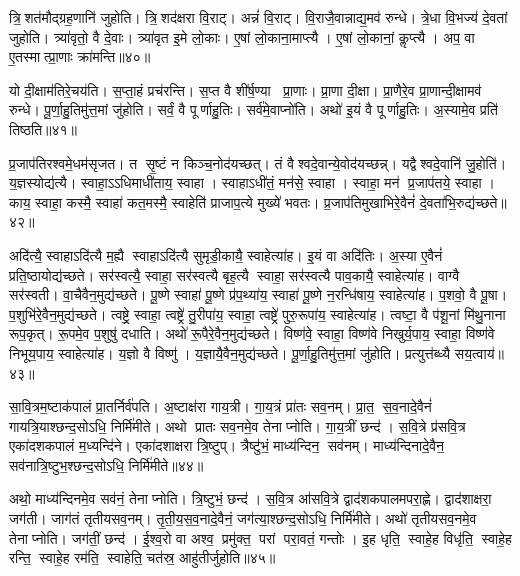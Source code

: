त्रि॒शत॑मौद्ग्रह॒णानि॑ जुहोति। त्रि॒शद॑क्षरा वि॒राट्। अन्नं॑ वि॒राट्। वि॒राजै॒वान्नाद्य॒मव॑ रुन्धे। त्रे॒धा वि॒भज्य॑ दे॒वतां जुहोति। त्र्या॑वृतो॒ वै दे॒वाः। त्र्या॑वृत इ॒मे लो॒काः। ए॒षां लो॒काना॒माप्त्यै। ए॒षां लो॒कानां॒ कॢप्त्यै। अप॒ वा ए॒तस्मात्प्रा॒णाः क्रा॑मन्ति॥४०॥

यो दी॒क्षाम॑तिरे॒चय॑ति। स॒प्ता॒हं प्रच॑रन्ति। स॒प्त वै शी॑र्\mbox{}ष॒ण्या प्रा॒णाः। प्रा॒णा दी॒क्षा। प्रा॒णैरे॒व प्रा॒णान्दी॒क्षामव॑ रुन्धे। पू॒र्णा॒हु॒तिमु॑त्त॒मां जु॑होति। सर्वं॒ वै पूर्णाहु॒तिः। सर्व॑मे॒वाप्नो॑ति। अथो॑ इ॒यं वै पूर्णाहु॒तिः। अ॒स्यामे॒व प्रति॑ तिष्ठति॥४१॥\anuvakamend[रु॒न्धे॒ प्रा॒णान्दी॒क्षामव॑ रुन्ध उच्यते क्रामन्ति तिष्ठति]

प्र॒जाप॑तिरश्वमे॒धम॑सृजत। त सृ॒ष्टं न किञ्च॒नोद॑यच्छत्। तं वैश्वदे॒वान्ये॒वोद॑यच्छन्न्। यद्वैश्वदे॒वानि॑ जु॒होति॑। य॒ज्ञस्योद्य॑त्यै। स्वाहा॒ऽऽधिमाधी॑ताय॒ स्वाहा। स्वाहाऽधी॑तं॒ मन॑से॒ स्वाहा। स्वाहा॒ मन॑ प्र॒जाप॑तये॒ स्वाहा। काय॒ स्वाहा॒ कस्मै॒ स्वाहा॑ कत॒मस्मै॒ स्वाहेति॑ प्राजाप॒त्ये मुख्ये॑ भवतः। प्र॒जाप॑तिमुखाभिरे॒वैनं॑ दे॒वता॑भि॒रुद्य॑च्छते॥४२॥

अदि॑त्यै॒ स्वाहाऽदि॑त्यै म॒ह्यै स्वाहाऽदि॑त्यै सुमृडी॒कायै॒ स्वाहेत्या॑ह। इ॒यं वा अदि॑तिः। अ॒स्या ए॒वैनं॑ प्रति॒ष्ठायोद्य॑च्छते। सर॑स्वत्यै॒ स्वाहा॒ सर॑स्वत्यै बृह॒त्यै स्वाहा॒ सर॑स्वत्यै पाव॒कायै॒ स्वाहेत्या॑ह। वाग्वै सर॑स्वती। वा॒चैवैन॒मुद्य॑च्छते। पू॒ष्णे स्वाहा॑ पू॒ष्णे प्र॑प॒थ्या॑य॒ स्वाहा॑ पू॒ष्णे न॒रन्धि॑षाय॒ स्वाहेत्या॑ह। प॒शवो॒ वै पू॒षा। प॒शुभि॑रे॒वैन॒मुद्य॑च्छते। त्वष्ट्रे॒ स्वाहा॒ त्वष्ट्रे॑ तु॒रीपा॑य॒ स्वाहा॒ त्वष्ट्रे॑ पुरु॒रूपा॑य॒ स्वाहेत्या॑ह। त्वष्टा॒ वै प॑शू॒नां मि॑थु॒नाना रूप॒कृत्। रू॒पमे॒व प॒शुषु॑ दधाति। अथो॑ रू॒पैरे॒वैन॒मुद्य॑च्छते। विष्ण॑वे॒ स्वाहा॒ विष्ण॑वे निखुर्य॒पाय॒ स्वाहा॒ विष्ण॑वे निभूय॒पाय॒ स्वाहेत्या॑ह। य॒ज्ञो वै विष्णु॑। य॒ज्ञायै॒वैन॒मुद्य॑च्छते। पू॒र्णा॒हु॒तिमु॑त्त॒मां जु॑होति। प्रत्युत्त॑ब्ध्यै सय॒त्वाय॑॥४३॥\anuvakamend[य॒च्छ॒ते॒ पु॒रु॒रूपा॑य॒ स्वाहेत्या॑हा॒ष्टौ च॑]

सा॒वि॒त्रम॒ष्टाक॑पालं प्रा॒तर्निर्व॑पति। अ॒ष्टाक्ष॑रा गाय॒त्री। गा॒य॒त्रं प्रा॑तः सव॒नम्। प्रा॒त॒ स॒व॒नादे॒वैनं॑ गायत्रि॒याश्छन्द॒सोऽधि॒ निर्मि॑मीते। अथो प्रातः सव॒नमे॒व तेनाप्नोति। गा॒य॒त्रीं छन्द॑। स॒वि॒त्रे प्र॑सवि॒त्र एका॑दशकपालं म॒ध्यन्दि॑ने। एका॑दशाक्षरा त्रि॒ष्टुप्। त्रैष्टु॑भं॒ माध्य॑न्दिन॒ सव॑नम्। माध्य॑न्दिनादे॒वैन॒ सव॑नात्रि॒ष्टुभ॒श्छन्द॒सोऽधि॒ निर्मि॑मीते॥४४॥

अथो॒ माध्य॑न्दिनमे॒व सव॑नं॒ तेनाप्नोति। त्रि॒ष्टुभं॒ छन्द॑। स॒वि॒त्र आ॑सवि॒त्रे द्वाद॑शकपालमपरा॒ह्णे। द्वाद॑शाक्षरा॒ जग॑ती। जाग॑तं तृतीयसव॒नम्। तृ॒ती॒य॒स॒व॒नादे॒वैनं॒ जग॑त्या॒श्छन्द॒सोऽधि॒ निर्मि॑मीते। अथो॑ तृतीयसव॒नमे॒व तेनाप्नोति। जग॑तीं॒ छन्द॑। ई॒श्व॒रो वा अश्व॒ प्रमु॑क्त॒ परां परा॒वतं॒ गन्तोः। इ॒ह धृति॒ स्वाहे॒ह विधृ॑ति॒ स्वाहे॒ह रन्ति॒ स्वाहे॒ह रम॑ति॒ स्वाहेति॒ चत॑स्र॒ आहु॑तीर्जुहोति॥४५॥


